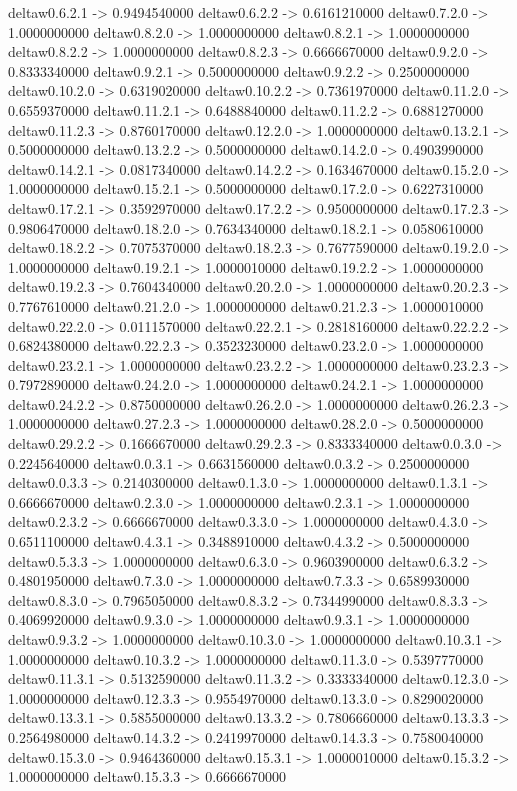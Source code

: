 deltaw0.6.2.1 -> 0.9494540000    deltaw0.6.2.2 -> 0.6161210000    deltaw0.7.2.0 -> 1.0000000000    deltaw0.8.2.0 -> 1.0000000000    deltaw0.8.2.1 -> 1.0000000000    deltaw0.8.2.2 -> 1.0000000000    deltaw0.8.2.3 -> 0.6666670000    deltaw0.9.2.0 -> 0.8333340000    deltaw0.9.2.1 -> 0.5000000000    deltaw0.9.2.2 -> 0.2500000000    deltaw0.10.2.0 -> 0.6319020000    deltaw0.10.2.2 -> 0.7361970000    deltaw0.11.2.0 -> 0.6559370000    deltaw0.11.2.1 -> 0.6488840000    deltaw0.11.2.2 -> 0.6881270000    deltaw0.11.2.3 -> 0.8760170000    deltaw0.12.2.0 -> 1.0000000000    deltaw0.13.2.1 -> 0.5000000000    deltaw0.13.2.2 -> 0.5000000000    deltaw0.14.2.0 -> 0.4903990000    deltaw0.14.2.1 -> 0.0817340000    deltaw0.14.2.2 -> 0.1634670000    deltaw0.15.2.0 -> 1.0000000000    deltaw0.15.2.1 -> 0.5000000000    deltaw0.17.2.0 -> 0.6227310000    deltaw0.17.2.1 -> 0.3592970000    deltaw0.17.2.2 -> 0.9500000000    deltaw0.17.2.3 -> 0.9806470000    deltaw0.18.2.0 -> 0.7634340000    deltaw0.18.2.1 -> 0.0580610000    deltaw0.18.2.2 -> 0.7075370000    deltaw0.18.2.3 -> 0.7677590000    deltaw0.19.2.0 -> 1.0000000000    deltaw0.19.2.1 -> 1.0000010000    deltaw0.19.2.2 -> 1.0000000000    deltaw0.19.2.3 -> 0.7604340000    deltaw0.20.2.0 -> 1.0000000000    deltaw0.20.2.3 -> 0.7767610000    deltaw0.21.2.0 -> 1.0000000000    deltaw0.21.2.3 -> 1.0000010000    deltaw0.22.2.0 -> 0.0111570000    deltaw0.22.2.1 -> 0.2818160000    deltaw0.22.2.2 -> 0.6824380000    deltaw0.22.2.3 -> 0.3523230000    deltaw0.23.2.0 -> 1.0000000000    deltaw0.23.2.1 -> 1.0000000000    deltaw0.23.2.2 -> 1.0000000000    deltaw0.23.2.3 -> 0.7972890000    deltaw0.24.2.0 -> 1.0000000000    deltaw0.24.2.1 -> 1.0000000000    deltaw0.24.2.2 -> 0.8750000000    deltaw0.26.2.0 -> 1.0000000000    deltaw0.26.2.3 -> 1.0000000000    deltaw0.27.2.3 -> 1.0000000000    deltaw0.28.2.0 -> 0.5000000000    deltaw0.29.2.2 -> 0.1666670000    deltaw0.29.2.3 -> 0.8333340000    deltaw0.0.3.0 -> 0.2245640000    deltaw0.0.3.1 -> 0.6631560000    deltaw0.0.3.2 -> 0.2500000000    deltaw0.0.3.3 -> 0.2140300000    deltaw0.1.3.0 -> 1.0000000000    deltaw0.1.3.1 -> 0.6666670000    deltaw0.2.3.0 -> 1.0000000000    deltaw0.2.3.1 -> 1.0000000000    deltaw0.2.3.2 -> 0.6666670000    deltaw0.3.3.0 -> 1.0000000000    deltaw0.4.3.0 -> 0.6511100000    deltaw0.4.3.1 -> 0.3488910000    deltaw0.4.3.2 -> 0.5000000000    deltaw0.5.3.3 -> 1.0000000000    deltaw0.6.3.0 -> 0.9603900000    deltaw0.6.3.2 -> 0.4801950000    deltaw0.7.3.0 -> 1.0000000000    deltaw0.7.3.3 -> 0.6589930000    deltaw0.8.3.0 -> 0.7965050000    deltaw0.8.3.2 -> 0.7344990000    deltaw0.8.3.3 -> 0.4069920000    deltaw0.9.3.0 -> 1.0000000000    deltaw0.9.3.1 -> 1.0000000000    deltaw0.9.3.2 -> 1.0000000000    deltaw0.10.3.0 -> 1.0000000000    deltaw0.10.3.1 -> 1.0000000000    deltaw0.10.3.2 -> 1.0000000000    deltaw0.11.3.0 -> 0.5397770000    deltaw0.11.3.1 -> 0.5132590000    deltaw0.11.3.2 -> 0.3333340000    deltaw0.12.3.0 -> 1.0000000000    deltaw0.12.3.3 -> 0.9554970000    deltaw0.13.3.0 -> 0.8290020000    deltaw0.13.3.1 -> 0.5855000000    deltaw0.13.3.2 -> 0.7806660000    deltaw0.13.3.3 -> 0.2564980000    deltaw0.14.3.2 -> 0.2419970000    deltaw0.14.3.3 -> 0.7580040000    deltaw0.15.3.0 -> 0.9464360000    deltaw0.15.3.1 -> 1.0000010000    deltaw0.15.3.2 -> 1.0000000000    deltaw0.15.3.3 -> 0.6666670000    